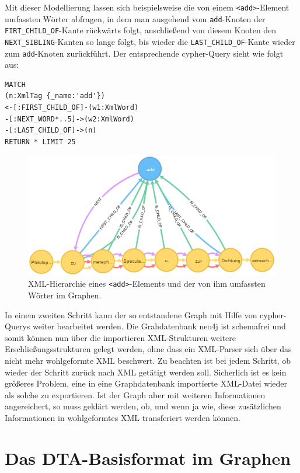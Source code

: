 \documentclass[ngerman,]{scrreprt}
\begin{document}
Mit dieser Modellierung lassen sich beispielsweise die von einem \texttt{\textless{}add\textgreater{}}-Element umfassten Wörter abfragen, in dem man ausgehend vom \texttt{add}-Knoten der \texttt{FIRT\_CHILD\_OF}-Kante rückwärts folgt, anschließend von diesem Knoten den \texttt{NEXT\_SIBLING}-Kanten so lange folgt, bis wieder die \texttt{LAST\_CHILD\_OF}-Kante wieder zum \texttt{add}-Knoten zurückführt. Der entsprechende cypher-Query sieht wie folgt aus:

\begin{verbatim}
MATCH
(n:XmlTag {_name:'add'})
<-[:FIRST_CHILD_OF]-(w1:XmlWord)
-[:NEXT_WORD*..5]->(w2:XmlWord)
-[:LAST_CHILD_OF]->(n)
RETURN * LIMIT 25
\end{verbatim}

\begin{figure}
\centering
\includegraphics{Bilder/TEI2Graph/XML-Hierarchie.png}
\caption{XML-Hierarchie eines \texttt{\textless{}add\textgreater{}}-Elements und der von ihm umfassten Wörter im Graphen.}
\end{figure}

In einem zweiten Schritt kann der so entstandene Graph mit Hilfe von cypher-Querys weiter bearbeitet werden. Die Grahdatenbank neo4j ist schemafrei und somit können nun über die importieren XML-Strukturen weitere Erschließungsstrukturen gelegt werden, ohne dass ein XML-Parser sich über das nicht mehr wohlgeformte XML beschwert. Zu beachten ist bei jedem Schritt, ob wieder der Schritt zurück nach XML getätigt werden soll. Sicherlich ist es kein größeres Problem, eine in eine Graphdatenbank importierte XML-Datei wieder als solche zu exportieren. Ist der Graph aber mit weiteren Informationen angereichert, so muss geklärt werden, ob, und wenn ja wie, diese zusätzlichen Informationen in wohlgeformtes XML transferiert werden können.

\chapter{Das DTA-Basisformat im Graphen}\label{das-dta-basisformat-im-graphen}
\end{document}
